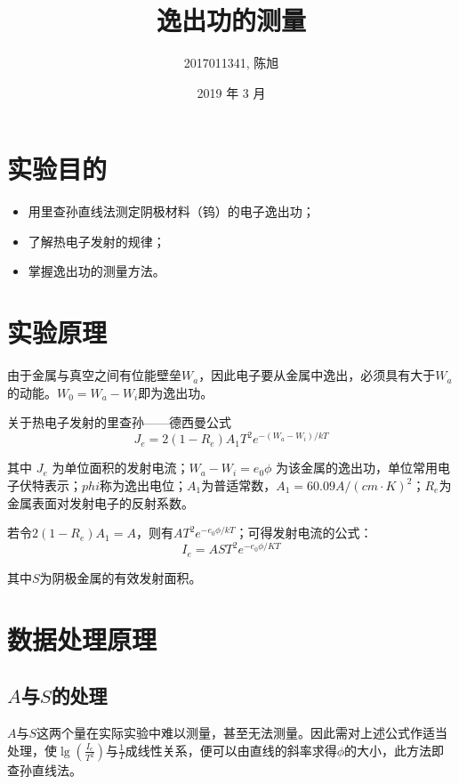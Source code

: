 \documentclass[a4paper]{article}
\title{逸出功的测量}
\author{2017011341, 陈旭}
\date{2019 年 3 月}
\begin{document}
\maketitle

\section{实验目的}

\begin{itemize}
	\item 用里查孙直线法测定阴极材料（钨）的电子逸出功；
	\item 了解热电子发射的规律；
	\item 掌握逸出功的测量方法。
\end{itemize}

\section{实验原理}

\par 由于金属与真空之间有位能壁垒$W_a$，因此电子要从金属中逸出，必须具有大于$W_a$的动能。$W_0=W_a-W_i$即为逸出功。

\par 关于热电子发射的里查孙——德西曼公式
$$J_e=2(1-R_e)A_1T^2e^{-(W_a-W_i)/kT}$$
\par 其中 $J_e$ 为单位面积的发射电流；$W_a-W_i=e_0 \phi$ 为该金属的逸出功，单位常用电子伏特表示；$phi$称为逸出电位；$A_1$为普适常数，$A_1=60.09A/(cm\cdot K)^2$；$R_e$为金属表面对发射电子的反射系数。

\par 若令$2(1-R_e)A_1=A$，则有$AT^2e^{-e_0\phi/kT}$；可得发射电流的公式：
$$I_e=AST^2e^{-e_0\phi/KT}$$
\par 其中$S$为阴极金属的有效发射面积。

\section{数据处理原理}

\subsection{$A$与$S$的处理}

\par $A$与$S$这两个量在实际实验中难以测量，甚至无法测量。因此需对上述公式作适当处理，使$\lg(\frac{I_e}{T^2})$与$\frac{1}{T}$成线性关系，便可以由直线的斜率求得$\phi$的大小，此方法即查孙直线法。
\end{document}
